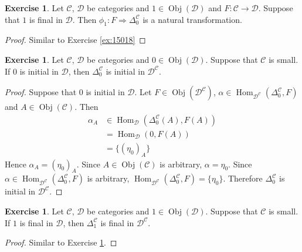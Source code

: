 \documentclass{book}
\theoremstyle{definition}
\newtheorem{ex}[definition]{Exercise}
\newcommand{\al}{\alpha}
\newcommand{\Del}{\Delta}
\newcommand{\MC}{\mathcal{C}}
\newcommand{\MD}{\mathcal{D}}
\newcommand{\lex}[1]{\label{ex:#1}}
\newcommand{\rex}[1]{Exercise \ref{ex:#1}}
\DeclareMathOperator{\Obj}{Obj}
\DeclareMathOperator{\Hom}{Hom}
\DeclareMathOperator*{\0}{\mbf{0}}
\DeclareMathOperator*{\1}{\mbf{1}}
\begin{document}
	\begin{ex} \lex{15019}
		Let $\MC$, $\MD$ be categories and $1 \in \Obj(\MD)$ and $F: \MC \rightarrow \MD$. Suppose that $1$ is final in $\MD$. Then $\phi_{1}: F \Rightarrow \Del^{\MC}_0$ is a natural transformation.
	\end{ex}

	\begin{proof}
		Similar to \rex{15018}
	\end{proof}
	
	\begin{ex} \lex{15020}
		Let $\MC$, $\MD$ be categories and $0 \in \Obj(\MD)$. Suppose that $\MC$ is small. If $0$ is initial in $\MD$, then $\Del^{\MC}_0$ is initial in $\MD^{\MC}$. 
	\end{ex}

	\begin{proof}
		Suppose that $0$ is initial in $\MD$. Let $F \in \Obj(\MD^{\MC})$, $\al \in \Hom_{\MD^{\MC}}(\Del^{\MC}_0, F)$ and $A \in \Obj(\MC)$. Then
		\begin{align*}
			\al_A 
			& \in \Hom_{\MD}(\Del^{\MC}_0(A), F(A)) \\
			& =  \Hom_{\MD}(0, F(A)) \\
			& = \{(\eta_0)_A\}
		\end{align*}
		Hence $\al_A = (\eta_0)_A$. Since $A \in \Obj(\MC)$ is arbitrary, $\al = \eta_0$. Since $\al \in  \Hom_{\MD^{\MC}}(\Del^{\MC}_0, F)$ is arbitrary, $ \Hom_{\MD^{\MC}}(\Del^{\MC}_0, F) = \{\eta_0\}$. Therefore $\Del^{\MC}_0$ is initial in $\MD^{\MC}$.
	\end{proof}


	\begin{ex} \lex{15021}
		Let $\MC$, $\MD$ be categories and $1 \in \Obj(\MD)$. Suppose that $\MC$ is small. If $1$ is final in $\MD$, then $\Del^{\MC}_1$ is final in $\MD^{\MC}$. 
	\end{ex}

	\begin{proof}
		Similar to \rex{15020}.
	\end{proof}
	
\end{document}
